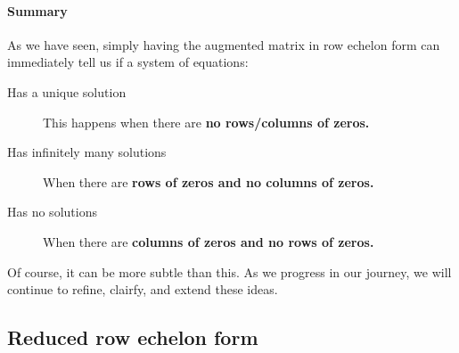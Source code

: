 \documentclass{ximera}
\begin{document}
\paragraph{Summary}

As we have seen, simply having the augmented matrix in row echelon form can immediately tell us if a system of equations:
\begin{description}
\item[Has a unique solution] This happens when there are \textbf{no rows/columns of zeros.}
\item[Has infinitely many solutions] When there are \textbf{rows of zeros and no columns of zeros.}
\item[Has no solutions] When there are  \textbf{columns of zeros and no rows of zeros.}
\end{description}
Of course, it can be more subtle than this. As we progress in our
journey, we will continue to refine, clairfy, and extend these ideas.





\subsection{Reduced row echelon form}
\end{document}
